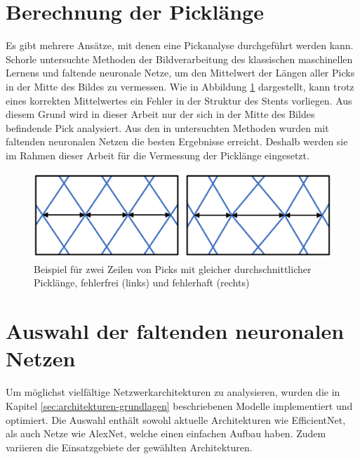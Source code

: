 \section{Berechnung der Picklänge}
Es gibt mehrere Ansätze, mit denen eine Pickanalyse durchgeführt werden kann. Schorle \cite{felix} untersuchte Methoden der Bildverarbeitung des klassischen maschinellen Lernens und faltende neuronale Netze, um den Mittelwert der Längen aller Picks in der Mitte des Bildes zu vermessen. Wie in Abbildung \ref{fig:abweichungen-vgl} dargestellt, kann trotz eines korrekten Mittelwertes ein Fehler in der Struktur des Stents vorliegen. Aus diesem Grund wird in dieser Arbeit nur der sich in der Mitte des Bildes befindende Pick analysiert. Aus den in \cite{felix} untersuchten Methoden wurden mit faltenden neuronalen Netzen die besten Ergebnisse erreicht. Deshalb werden sie im Rahmen dieser Arbeit für die Vermessung der Picklänge eingesetzt.

\begin{figure}[h!]
\centering
\includegraphics[width=13cm]{98_images/abweichungen_vgl.png}
\caption{Beispiel für zwei Zeilen von Picks mit gleicher durchschnittlicher Picklänge, fehlerfrei (links) und fehlerhaft (rechts)}
\label{fig:abweichungen-vgl}
\end{figure}


\section{Auswahl der faltenden neuronalen Netzen}\label{sec:auswahl-cnns}
Um möglichst vielfältige Netzwerkarchitekturen zu analysieren, wurden die in Kapitel \ref{sec:architekturen-grundlagen} beschriebenen Modelle implementiert und optimiert. Die Auswahl enthält sowohl aktuelle Architekturen wie EfficientNet, als auch Netze wie AlexNet, welche einen einfachen Aufbau haben. Zudem variieren die Einsatzgebiete der gewählten Architekturen.

